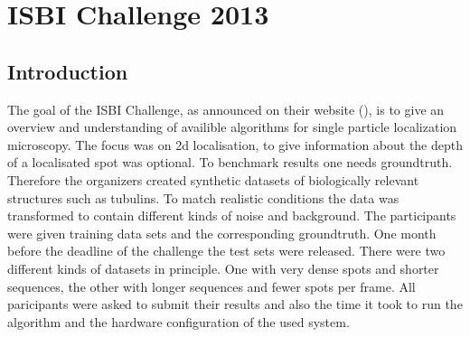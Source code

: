 \chapter{ISBI Challenge 2013}
\section{Introduction}
The goal of the ISBI Challenge, as announced on their website (\cite{challenge}), is to give an overview and understanding of availible algorithms for single particle localization microscopy. The focus was on 2d localisation, to give information about the depth of a localisated spot was optional. To benchmark results one needs groundtruth. Therefore the organizers created synthetic datasets of biologically relevant structures such as tubulins. To match realistic conditions the data was transformed to contain different kinds of noise and background.\newline
The participants were given training data sets and the corresponding groundtruth. One month before the deadline of the challenge the test sets were released. There were two different kinds of datasets in principle. One with very dense spots and shorter sequences, the other with longer sequences and fewer spots per frame.\newline
All paricipants were asked to submit their results and also the time it took to run the algorithm and the hardware configuration of the used system.

